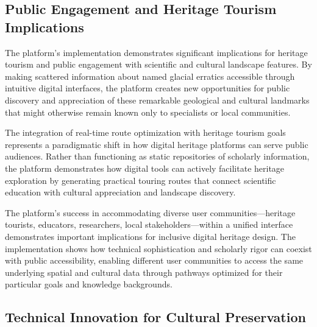 \subsection{Public Engagement and Heritage Tourism Implications}
\label{subsec:public_engagement_implications}

The platform's implementation demonstrates significant implications for heritage tourism and public engagement with scientific and cultural landscape features. By making scattered information about named glacial erratics accessible through intuitive digital interfaces, the platform creates new opportunities for public discovery and appreciation of these remarkable geological and cultural landmarks that might otherwise remain known only to specialists or local communities.

The integration of real-time route optimization with heritage tourism goals represents a paradigmatic shift in how digital heritage platforms can serve public audiences. Rather than functioning as static repositories of scholarly information, the platform demonstrates how digital tools can actively facilitate heritage exploration by generating practical touring routes that connect scientific education with cultural appreciation and landscape discovery.


The platform's success in accommodating diverse user communities—heritage tourists, educators, researchers, local stakeholders—within a unified interface demonstrates important implications for inclusive digital heritage design. The implementation shows how technical sophistication and scholarly rigor can coexist with public accessibility, enabling different user communities to access the same underlying spatial and cultural data through pathways optimized for their particular goals and knowledge backgrounds.

\subsection{Technical Innovation for Cultural Preservation}
\label{subsec:technical_innovation}

